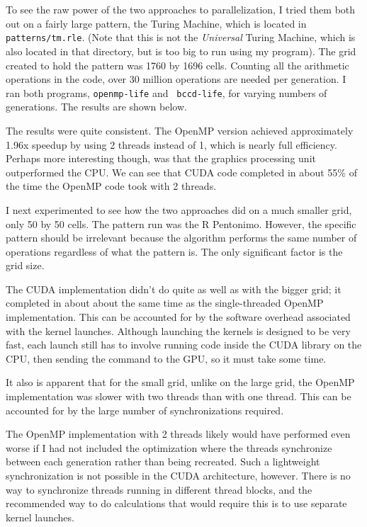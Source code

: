 \documentclass[letterpaper,12pt]{article}
\begin{document}
To see the raw power of the two approaches to parallelization, I tried them both
out on a fairly large pattern, the Turing Machine, which is located in {\tt
patterns/tm.rle}.  (Note that this is not the {\em Universal} Turing Machine,
which is also located in that directory, but is too big to run using my
program).  The grid created to hold the pattern was 1760 by 1696 cells.
Counting all the arithmetic operations in the code, over 30 million operations
are needed per generation.  I ran both programs, {\tt openmp-life} and {\tt
bccd-life}, for varying numbers of generations.  The results are shown below.



The results were quite consistent.  The OpenMP version achieved approximately
1.96x speedup by using 2 threads instead of 1, which is nearly full efficiency.
Perhaps more interesting though, was that the graphics processing unit
outperformed the CPU.  We can see that CUDA code completed in about 55\% of the
time the OpenMP code took with 2 threads. 

I next experimented to see how the two approaches did on a much smaller grid,
only 50 by 50 cells.  The pattern run was the R Pentonimo.   However, the
specific pattern should be irrelevant because the algorithm performs the same
number of operations regardless of what the pattern is. The only significant
factor is the grid size.



The CUDA implementation didn't do quite as well as with the bigger grid; it
completed in about about the same time as the single-threaded OpenMP
implementation.  This can be accounted for by the software overhead associated
with the kernel launches.  Although launching the kernels is designed to be very
fast, each launch still has to involve running code inside the CUDA library on
the CPU, then sending the command to the GPU, so it must take some time. 

It also is apparent that for the small grid, unlike on the large grid, the
OpenMP implementation was slower with two threads than with one thread.  This
can be accounted for by the large number of synchronizations required.

The OpenMP implementation with 2 threads likely would have performed even worse
if I had not included the optimization where the threads synchronize between
each generation rather than being recreated.  Such a lightweight synchronization
is not possible in the CUDA architecture, however. There is no way to
synchronize threads running in different thread blocks, and the recommended way
to do calculations that would require this is to use separate kernel launches.
\end{document}
